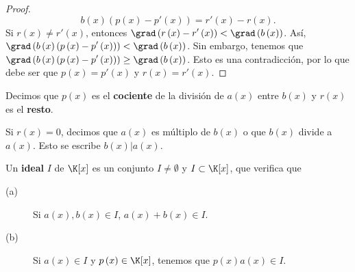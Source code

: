 \begin{proof}
\[b\left(x\right) \left(p\left(x\right)-p'\left(x\right)\right) = r'\left(x\right) -r\left(x\right) .\]
Si $\displaystyle r\left(x\right) \neq r'\left(x\right) $, entonces $\displaystyle \grad\left(r\left(x\right)-r'\left(x\right)\right) < \grad\left(b\left(x\right)\right) $. Así, $\displaystyle \grad\left(b\left(x\right)\left(p\left(x\right)-p'\left(x\right)\right)\right) < \grad\left(b\left(x\right)\right) $. Sin embargo, tenemos que $\displaystyle \grad\left(b\left(x\right)\left(p\left(x\right)-p'\left(x\right)\right)\right) \geq \grad\left(b\left(x\right)\right) $. Esto es una contradicción, por lo que debe ser que $\displaystyle p\left(x\right) = p'\left(x\right) $ y $\displaystyle r\left(x\right) = r'\left(x\right) $.
\end{proof}

\begin{fdefinition}[]
\normalfont Decimos que $\displaystyle p\left(x\right) $ es el \textbf{cociente} de la división de $\displaystyle a\left(x\right) $ entre $\displaystyle b\left(x\right) $ y $\displaystyle r\left(x\right) $ es el \textbf{resto}.
\end{fdefinition}

\begin{fdefinition}[]
\normalfont Si $\displaystyle r\left(x\right) = 0 $, decimos que $\displaystyle a\left(x\right) $ es múltiplo de $\displaystyle b\left(x\right) $ o que $\displaystyle b\left(x\right) $ divide a $\displaystyle a\left(x\right) $. Esto se escribe $\displaystyle b\left(x\right) | a\left(x\right) $.
\end{fdefinition}

\begin{fdefinition}[Ideal]
	\normalfont Un \textbf{ideal} $\displaystyle I $ de $\displaystyle \K[x] $ es un conjunto $\displaystyle I \neq \emptyset $ y $\displaystyle I \subset \K[x] $, que verifica que
	\begin{description}
	\item[(a)] Si $\displaystyle a\left(x\right), b\left(x\right) \in I $, $\displaystyle a\left(x\right)+b\left(x\right)\in I $.
	\item[(b)] Si $\displaystyle a\left(x\right) \in I $ y $\displaystyle p\left(x\right) \in \K[x] $, tenemos que $\displaystyle p\left(x\right)a\left(x\right) \in I $.
	\end{description}
\end{fdefinition}

